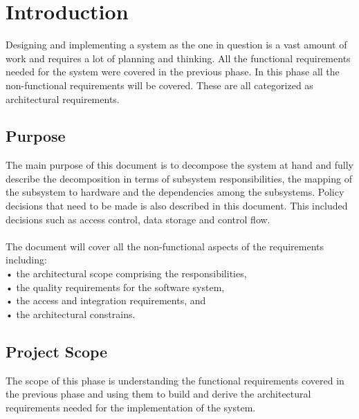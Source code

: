 \documentclass[a4paper,12pt]{report}
\begin{document}
\section{Introduction}
Designing and implementing a system as the one in question is a vast amount of work and requires a lot of planning and thinking. All the functional requirements needed for the system were covered in the previous phase. In this phase all the non-functional requirements will be covered. These are all categorized as architectural requirements.  \\
\subsection{Purpose}
The main purpose of this document is to decompose the system at hand and fully describe the decomposition in terms of subsystem responsibilities, the mapping of the subsystem to hardware and the dependencies among the subsystems. Policy decisions that need to be made is also described in this document. This included decisions such as access control, data storage and control flow.\\\\
The document will cover all the non-functional aspects of the requirements including:\\
•	the architectural scope comprising the responsibilities,\\
•	the quality requirements for the software system,\\
•	the access and integration requirements, and\\
•	the architectural constrains. \\

\subsection{Project Scope}
The scope of this phase is understanding the functional requirements covered in the previous phase and using them to build and derive the architectural requirements needed for the implementation of the system.\\
\end{document}
